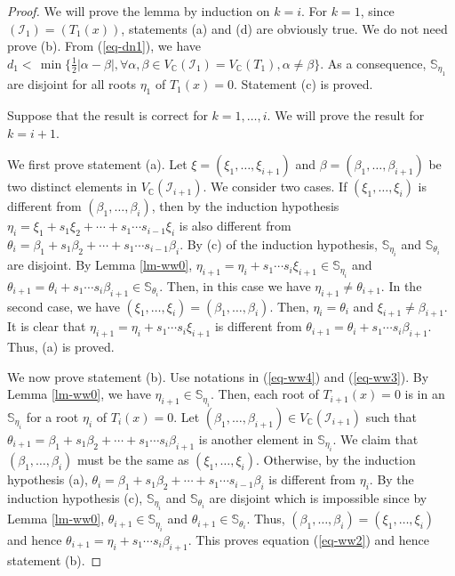 \documentclass[amsthm]{JSC_LaTex_2007_Mar_12/elsart}
\def\bref#1{(\ref{#1})}
\def\C{{\mathbb{C}}}
\def\IS{{\mathcal{I}}}
\begin{document}
\begin{proof}
We will prove the lemma by induction on $k=i$.
For $k=1$, since $(\IS_1) = (T_1(x))$,  statements (a) and (d) are
obviously true. We do not need prove (b).
From \bref{eq-dn1}, we have $d_1<\,\min\{\frac{1}{2}|\alpha-\beta|,
\forall \alpha, \beta\in V_{\C}(\IS_1)= V_{\C}(T_1),
\alpha\ne\beta\}$. As a consequence, $\mathbb{S}_{\eta_{1}}$ are
disjoint for all roots $\eta_1$ of $T_1(x)=0$. Statement (c) is
proved.

Suppose that the result is correct for $k=1,\ldots,i$. We will prove
the result for $k=i+1$.

We first prove statement (a). Let $\xi=(\xi_1,\ldots,\xi_{i+1})$ and
$\beta=(\beta_1,\ldots,\beta_{i+1})$ be two distinct elements in
$V_{\C}(\IS_{i+1})$.
We consider two cases. If $(\xi_1,\ldots,\xi_{i})$ is different from
$(\beta_1,\ldots,\beta_{i})$, then by the induction hypothesis
$\eta_{i}=\xi_1+ s_1\xi_2+\cdots+s_1\cdots s_{i-1} \xi_{i}$ is also
different from $\theta_{i}=\beta_1+ s_1\beta_2+\cdots+ s_1\cdots
s_{i-1} \beta_{i}$. By (c) of the induction hypothesis,
$\mathbb{S}_{\eta_{i}}$ and $\mathbb{S}_{\theta_{i}}$ are disjoint.
By Lemma \ref{lm-ww0},  $\eta_{i+1}=\eta_{i}+s_1\cdots s_{i}
\xi_{i+1}\in \mathbb{S}_{\eta_{i}}$ and
$\theta_{i+1}=\theta_{i}+s_1\cdots s_{i} \beta_{i+1}\in
\mathbb{S}_{\theta_{i}}$. Then, in this case we have
$\eta_{i+1}\ne\theta_{i+1}$.
In the second case, we have
$(\xi_1,\ldots,\xi_{i})=(\beta_1,\ldots,\beta_{i})$. Then,
$\eta_{i}=\theta_{i}$ and $\xi_{i+1}\ne \beta_{i+1}$. It is clear
that $\eta_{i+1} = \eta_{i} +s_1\cdots s_{i} \xi_{i+1}$ is
 different from $\theta_{i+1} = \theta_{i} +s_1\cdots s_{i}
\beta_{i+1}$. Thus, (a) is proved.

We now prove statement (b). Use notations in \bref{eq-ww4} and
\bref{eq-ww3}. By Lemma \ref{lm-ww0}, we have
$\eta_{i+1}\in\mathbb{S}_{\eta_{i}}$. Then, each root of
$T_{i+1}(x)=0$ is in an $\mathbb{S}_{\eta_{i}}$ for a root
$\eta_{i}$ of $T_{i}(x)=0$.
Let $(\beta_1,\ldots,\beta_{i+1})\in V_{\C}(\IS_{i+1})$ such that
$\theta_{i+1}=\beta_1+ s_1\beta_2+\cdots+ s_1\cdots s_{i}
\beta_{i+1}$ is another element in  $\mathbb{S}_{\eta_{i}}$.
We claim that $(\beta_1,\ldots,\beta_{i})$ must be the same as
$(\xi_1,\ldots,\xi_{i})$. Otherwise, by the induction hypothesis
(a), $\theta_{i}=\beta_1+ s_1\beta_2+\cdots+ s_1\cdots s_{i-1}
\beta_{i}$ is different from $\eta_i$. By the induction hypothesis
(c), $\mathbb{S}_{\eta_{i}}$ and  $\mathbb{S}_{\theta_{i}}$ are
disjoint which is impossible since by Lemma \ref{lm-ww0},
$\theta_{i+1}\in\mathbb{S}_{\eta_{i}}$ and
$\theta_{i+1}\in\mathbb{S}_{\theta_{i}}$.
Thus, $(\beta_1,\ldots,\beta_{i})=(\xi_1,\ldots,\xi_{i})$ and hence
$\theta_{i+1}=\eta_i + s_1\cdots s_{i} \beta_{i+1}$. This proves
equation \bref{eq-ww2} and hence statement (b).


\end{proof}
\end{document}
